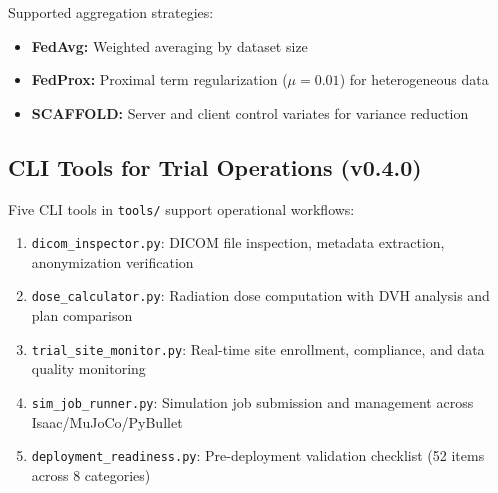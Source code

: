 Supported aggregation strategies:
\begin{itemize}
  \item \textbf{FedAvg:} Weighted averaging by dataset size~\cite{mcmahan2017fedavg}
  \item \textbf{FedProx:} Proximal term regularization ($\mu = 0.01$) for heterogeneous data~\cite{li2020fedprox}
  \item \textbf{SCAFFOLD:} Server and client control variates for variance reduction~\cite{karimireddy2020scaffold}
\end{itemize}

\subsection{CLI Tools for Trial Operations (v0.4.0)}
\label{sec:cli}

Five CLI tools in \texttt{tools/} support operational workflows:

\begin{enumerate}
  \item \texttt{dicom\_inspector.py}: DICOM file inspection, metadata extraction, anonymization verification
  \item \texttt{dose\_calculator.py}: Radiation dose computation with DVH analysis and plan comparison
  \item \texttt{trial\_site\_monitor.py}: Real-time site enrollment, compliance, and data quality monitoring
  \item \texttt{sim\_job\_runner.py}: Simulation job submission and management across Isaac/MuJoCo/PyBullet
  \item \texttt{deployment\_readiness.py}: Pre-deployment validation checklist (52 items across 8 categories)
\end{enumerate}

